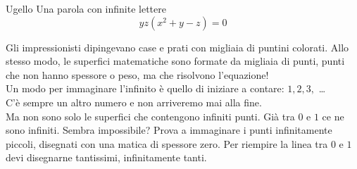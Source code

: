 \begin{surferPage}{Ugello}
Una parola con infinite lettere\\
\smallskip
\[y z (x^2	+ y - z)	= 0\]

\vspace{0.3cm}
Gli impressionisti dipingevano case e prati con migliaia di puntini colorati. Allo stesso modo, le superfici matematiche sono formate da migliaia di punti, punti che non hanno spessore o peso, ma che risolvono l'equazione! \\
\vspace{0.3cm}
Un modo per immaginare l'infinito \`e quello di iniziare a contare: $1, 2, 3,$ \dots\\
C'\`e sempre un altro numero e non arriveremo mai alla fine.\\
\vspace{0.3cm}
Ma non sono solo le superfici che contengono infiniti punti. Gi\`a tra $0$ e $1$ ce ne sono infiniti. Sembra impossibile? Prova a immaginare i punti infinitamente piccoli, disegnati con una matica di spessore zero. Per riempire la linea tra $0$ e $1$ devi disegnarne tantissimi, infinitamente tanti.
\end{surferPage}
